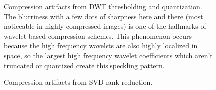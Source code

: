 \documentclass[conference]{IEEEtran}
\begin{document}
\begin{figure}
    \quad
    \caption{
        Compression artifacts from DWT thresholding and quantization.
        The blurriness with a few dots of sharpness here and there (most noticeable in highly compressed images) is one of the hallmarks of wavelet-based compression schemes.
        This phenomenon occurs because the high frequency wavelets are also highly localized in space, so the largest high frequency wavelet coefficients which aren't truncated or quantized create this speckling pattern.}
    \label{fig:dwt_results}
\end{figure}

\begin{figure}
    \quad
    \quad
    \caption{Compression artifacts from SVD rank reduction.}
    \label{fig:svd_results}
\end{figure}
\end{document}
